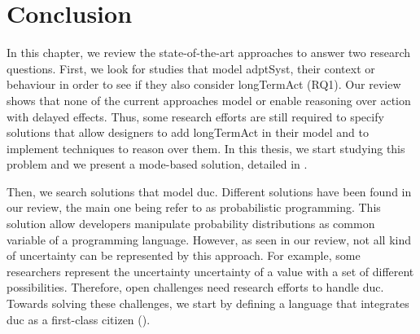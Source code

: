 \section{Conclusion}
\label{sec:sota:conclusion}

In this chapter, we review the state-of-the-art approaches to answer two research questions.
First, we look for studies that model \gls{adptSyst}, their context or \gls{behaviour} in order to see if they also consider \gls{longTermAct} (RQ1).
Our review shows that none of the current approaches model or enable reasoning over \gls{action} with delayed effects.
Thus, some research efforts are still required to specify solutions that allow designers to add \gls{longTermAct} in their model and to implement techniques to reason over them.
In this thesis, we start studying this problem and we present a mode-based solution, detailed in .

Then, we search solutions that model \gls{duc}.
Different solutions have been found in our review, the main one being refer to as probabilistic programming.
This solution allow developers manipulate probability distributions as common variable of a programming language.
However, as seen in our review, not all kind of uncertainty can be represented by this approach.
For example, some researchers represent the uncertainty uncertainty of a value with a set of different possibilities.
Therefore, open challenges need research efforts to handle \gls{duc}.
Towards solving these challenges, we start by defining a language that integrates \gls{duc} as a first-class citizen (\cf {}).
